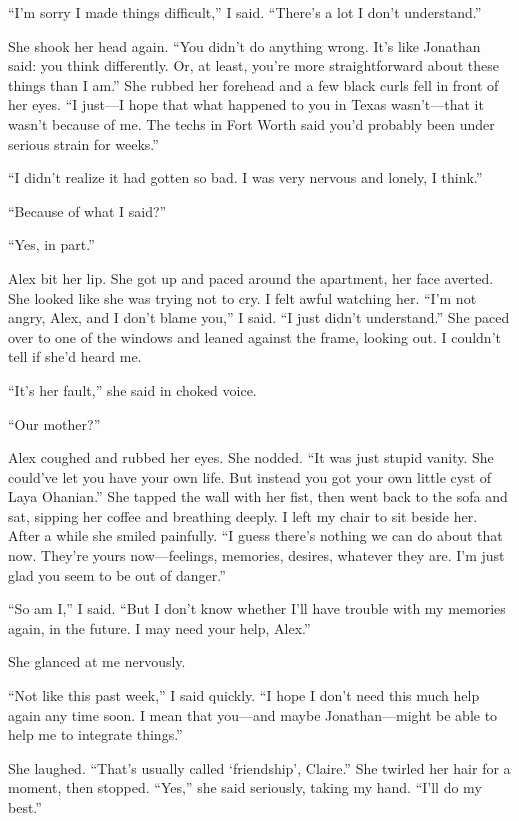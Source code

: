 \documentclass[10pt,b5paper]{article}
\begin{document}
``I'm sorry I made things difficult,'' I said. ``There's a lot I
don't understand.''

She shook her head again. ``You didn't do anything wrong. It's
like Jonathan said: you think differently. Or, at least, you're more
straightforward about these things than I am.'' She rubbed her forehead
and a few black curls fell in front of her eyes.  ``I just---I hope
that what happened to you in Texas wasn't---that it wasn't because
of me. The techs in Fort Worth said you'd probably been under serious
strain for weeks.''

``I didn't realize it had gotten so bad.  I was very nervous and
lonely, I think.''

``Because of what I said?''

``Yes, in part.''

Alex bit her lip. She got up and paced around the apartment, her
face averted. She looked like she was trying not to cry. I felt
awful watching her.  ``I'm not angry, Alex, and I don't blame you,''
I said. ``I just didn't understand.'' She paced over to one of the
windows and leaned against the frame, looking out. I couldn't tell
if she'd heard me.

``It's her fault,'' she said in choked voice.

``Our mother?''

Alex coughed and rubbed her eyes. She nodded.  ``It was just stupid
vanity. She could've let you have your own life. But instead you
got your own little cyst of Laya Ohanian.'' She tapped the wall
with her fist, then went back to the sofa and sat, sipping her
coffee and breathing deeply.  I left my chair to sit beside her.
After a while she smiled painfully. ``I guess there's nothing we can
do about that now.  They're yours now---feelings, memories, desires,
whatever they are.  I'm just glad you seem to be out of danger.''

``So am I,'' I said. ``But I don't know whether I'll have trouble
with my memories again, in the future. I may need your help, Alex.''

She glanced at me nervously.

``Not like this past week,'' I said quickly. ``I hope I don't need
this much help again any time soon. I mean that you---and maybe
Jonathan---might be able to help me to integrate things.''

She laughed. ``That's usually called `friendship', Claire.'' She
twirled her hair for a moment, then stopped.  ``Yes,'' she said
seriously, taking my hand. ``I'll do my best.''
\end{document}

